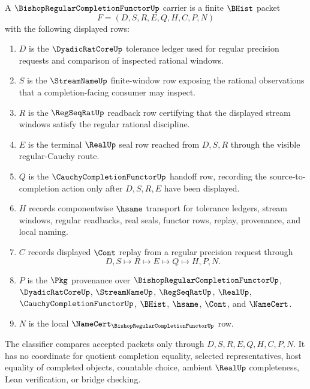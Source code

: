 \begin{definition}
\label{def:bishop-regular-completion-functor-carrier}
A $\BishopRegularCompletionFunctorUp$ carrier is a finite $\BHist$ packet
$$
F=(D,S,R,E,Q,H,C,P,N)
$$
with the following displayed rows:
\begin{enumerate}
\item $D$ is the $\DyadicRatCoreUp$ tolerance ledger used for regular precision requests and comparison of inspected rational windows.
\item $S$ is the $\StreamNameUp$ finite-window row exposing the rational observations that a completion-facing consumer may inspect.
\item $R$ is the $\RegSeqRatUp$ readback row certifying that the displayed stream windows satisfy the regular rational discipline.
\item $E$ is the terminal $\RealUp$ seal row reached from $D,S,R$ through the visible regular-Cauchy route.
\item $Q$ is the $\CauchyCompletionFunctorUp$ handoff row, recording the source-to-completion action only after $D,S,R,E$ have been displayed.
\item $H$ records componentwise $\hsame$ transport for tolerance ledgers, stream windows, regular readbacks, real seals, functor rows, replay, provenance, and local naming.
\item $C$ records displayed $\Cont$ replay from a regular precision request through
$$
D,S \longmapsto R \longmapsto E \longmapsto Q \longmapsto H,P,N .
$$
\item $P$ is the $\Pkg$ provenance over $\BishopRegularCompletionFunctorUp$, $\DyadicRatCoreUp$, $\StreamNameUp$, $\RegSeqRatUp$, $\RealUp$, $\CauchyCompletionFunctorUp$, $\BHist$, $\hsame$, $\Cont$, and $\NameCert$.
\item $N$ is the local $\NameCert_{\BishopRegularCompletionFunctorUp}$ row.
\end{enumerate}
The classifier compares accepted packets only through $D,S,R,E,Q,H,C,P,N$. It has no coordinate for quotient completion equality, selected representatives, host equality of completed objects, countable choice, ambient $\RealUp$ completeness, Lean verification, or bridge checking.
\end{definition}

